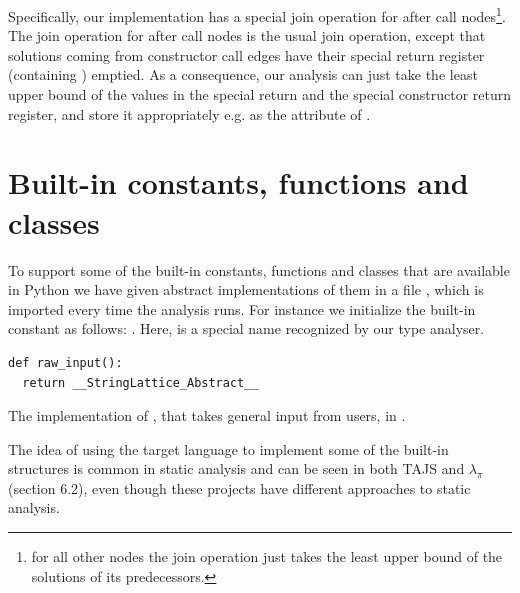 Specifically, our implementation has a special join operation for after call nodes\footnote{for all other nodes the join operation just takes the least upper bound of the solutions of its predecessors.}. The join operation for after call nodes is the usual join operation, except that solutions coming from constructor call edges have their special return register (containing ) emptied. As a consequence, our analysis can just take the least upper bound of the values in the special return and the special constructor return register, and store it appropriately e.g. as the attribute  of .


\section{Built-in constants, functions and classes}
To support some of the built-in constants, functions and classes that are available in Python we have given abstract implementations of them in a file , which is imported every time the analysis runs. For instance we initialize the built-in constant  as follows: . Here,  is a special name recognized by our type analyser.

\begin{listing}[H]
	\begin{verbatim}
def raw_input():
  return __StringLattice_Abstract__
	\end{verbatim}
	\caption{The implementation of , that takes general input from users, in .}
\end{listing}

The idea of using the target language to implement some of the built-in structures is common in static analysis and can be seen in both TAJS \cite{tajs} and $\lambda_{\pi}$ \cite{lambdapy} (section 6.2), even though these projects have different approaches to static analysis.



